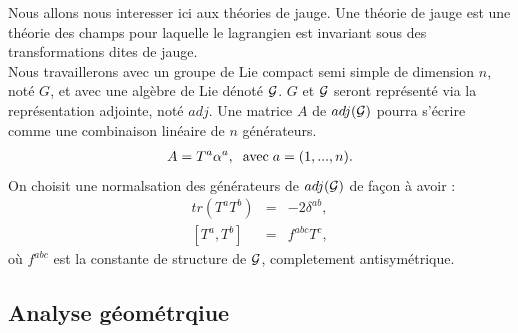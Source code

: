 \documentclass[a4paper,11pt]{article}
\theoremstyle{plain}
\theoremstyle{definition}
\theoremstyle{remark}
\numberwithin{equation}{section}
\numberwithin{equation}{subsection}
\numberwithin{figure}{section}
\begin{document}
\noindent
Nous allons nous interesser ici aux théories de jauge. Une théorie de jauge est une théorie des champs pour laquelle le lagrangien est invariant sous des transformations dites de jauge.\\
Nous travaillerons avec un groupe de Lie compact semi simple de dimension $n$, noté $G$, et avec une algèbre de Lie dénoté $\cal{G}$. $G$ et $\cal{G}$ seront représenté via la représentation adjointe, noté $adj$. Une matrice $A$ de $adj(\cal{G})$ pourra s'écrire comme une combinaison linéaire de $n$ générateurs. 
\begin{eqnarray}
 A = T^{a} \alpha^{a}, \hspace{2mm} \text{avec} \hspace{1mm} a =(1,...,n).
\end{eqnarray}
On choisit une normalsation des générateurs de $adj(\cal{G})$ de façon à avoir :
\begin{eqnarray}
 tr( T^{a} T^{b} ) &=& -2 \delta^{ab} ,  \\
 \left [ T^{a} ,  T^{b} \right] &=& f^{abc} T^{c} ,
\end{eqnarray}
où $f^{abc}$ est la constante de structure de $\cal{G}$, completement antisymétrique.

\subsection{Analyse géométrqiue}
\end{document}
